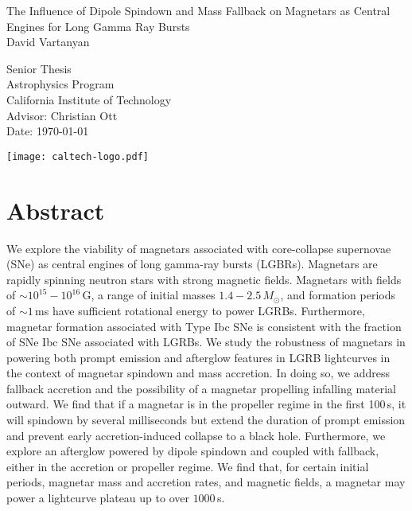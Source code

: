 \documentclass{article}
\begin{document}
\thispagestyle{empty}
\vspace*{3 cm}
\begin{center}
\Huge
The Influence of Dipole Spindown and Mass Fallback on Magnetars as Central Engines for Long Gamma Ray Bursts\\
\LARGE
\vspace{1.5 cm}
David Vartanyan\\
\vspace{2cm}

Senior Thesis\\
Astrophysics Program\\
California Institute of Technology\\

\vspace{3 cm}
\large
Advisor: Christian Ott\\
Date: \today
\end{center}
\vspace{1 cm}
\centerline{\texttt{[image: caltech-logo.pdf]}}

\newpage
\thispagestyle{empty}
\mbox{}

\newpage
{\centering\section*{Abstract}}
\setcounter{page}{1}
We explore the viability of magnetars associated with core-collapse supernovae (SNe) as central engines of long gamma-ray bursts (LGBRs). Magnetars are rapidly spinning neutron stars with strong magnetic fields. Magnetars with fields of $\sim 10^{15}-10^{16}$\,G, a range of initial masses $1.4-2.5\,M_{\odot}$, and formation periods of $\sim 1$\,ms have sufficient rotational energy to power LGRBs. Furthermore, magnetar formation associated with Type Ibc SNe is consistent with the fraction of SNe Ibc SNe associated with LGRBs. We study the robustness of magnetars in powering both prompt emission and afterglow features in LGRB lightcurves in the context of magnetar spindown and mass accretion. In doing so, we address fallback accretion and the possibility of a magnetar propelling infalling material outward. We find that if a magnetar is in the propeller regime in the first 100\,s, it will spindown by several milliseconds but extend the duration of prompt emission and prevent early accretion-induced collapse to a black hole. Furthermore, we explore an afterglow powered by dipole spindown and coupled with fallback, either in the accretion or propeller regime. We find that, for certain initial periods, magnetar mass and accretion rates, and magnetic fields, a magnetar may power a lightcurve plateau up to over $1000$\,s. 
\end{document}
